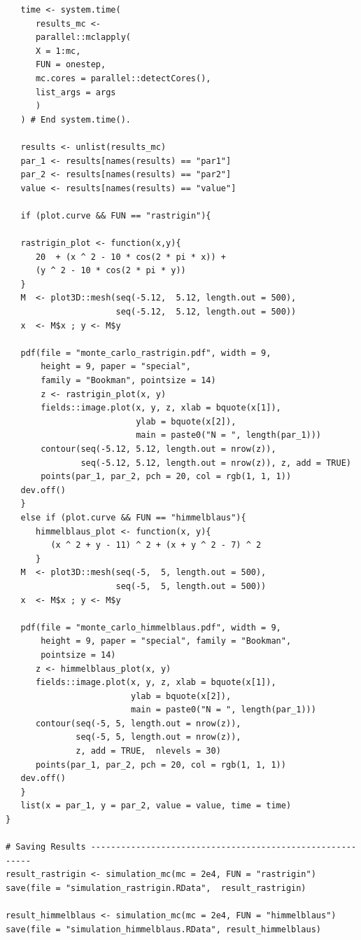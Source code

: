 \documentclass[10pt,letterpaper]{article}
\begin{document}
\begin{verbatim}
   time <- system.time(
      results_mc <-
      parallel::mclapply(
      X = 1:mc,
      FUN = onestep,
      mc.cores = parallel::detectCores(),
      list_args = args
      )
   ) # End system.time().

   results <- unlist(results_mc)
   par_1 <- results[names(results) == "par1"]
   par_2 <- results[names(results) == "par2"]
   value <- results[names(results) == "value"]

   if (plot.curve && FUN == "rastrigin"){

   rastrigin_plot <- function(x,y){
      20  + (x ^ 2 - 10 * cos(2 * pi * x)) +
      (y ^ 2 - 10 * cos(2 * pi * y))
   }
   M  <- plot3D::mesh(seq(-5.12,  5.12, length.out = 500), 
                      seq(-5.12,  5.12, length.out = 500))
   x  <- M$x ; y <- M$y

   pdf(file = "monte_carlo_rastrigin.pdf", width = 9, 
       height = 9, paper = "special",
       family = "Bookman", pointsize = 14)
       z <- rastrigin_plot(x, y)
       fields::image.plot(x, y, z, xlab = bquote(x[1]),
                          ylab = bquote(x[2]),
                          main = paste0("N = ", length(par_1)))
       contour(seq(-5.12, 5.12, length.out = nrow(z)),
               seq(-5.12, 5.12, length.out = nrow(z)), z, add = TRUE)
       points(par_1, par_2, pch = 20, col = rgb(1, 1, 1))
   dev.off()
   } 
   else if (plot.curve && FUN == "himmelblaus"){
      himmelblaus_plot <- function(x, y){
         (x ^ 2 + y - 11) ^ 2 + (x + y ^ 2 - 7) ^ 2
      }
   M  <- plot3D::mesh(seq(-5,  5, length.out = 500), 
                      seq(-5,  5, length.out = 500))
   x  <- M$x ; y <- M$y

   pdf(file = "monte_carlo_himmelblaus.pdf", width = 9, 
       height = 9, paper = "special", family = "Bookman",
       pointsize = 14)
      z <- himmelblaus_plot(x, y)
      fields::image.plot(x, y, z, xlab = bquote(x[1]),
                         ylab = bquote(x[2]),
                         main = paste0("N = ", length(par_1)))
      contour(seq(-5, 5, length.out = nrow(z)),
              seq(-5, 5, length.out = nrow(z)),
              z, add = TRUE,  nlevels = 30)
      points(par_1, par_2, pch = 20, col = rgb(1, 1, 1))
   dev.off()
   }
   list(x = par_1, y = par_2, value = value, time = time)
}

# Saving Results ----------------------------------------------------------
result_rastrigin <- simulation_mc(mc = 2e4, FUN = "rastrigin")
save(file = "simulation_rastrigin.RData",  result_rastrigin)

result_himmelblaus <- simulation_mc(mc = 2e4, FUN = "himmelblaus")
save(file = "simulation_himmelblaus.RData", result_himmelblaus)
\end{verbatim}

\end{document}
